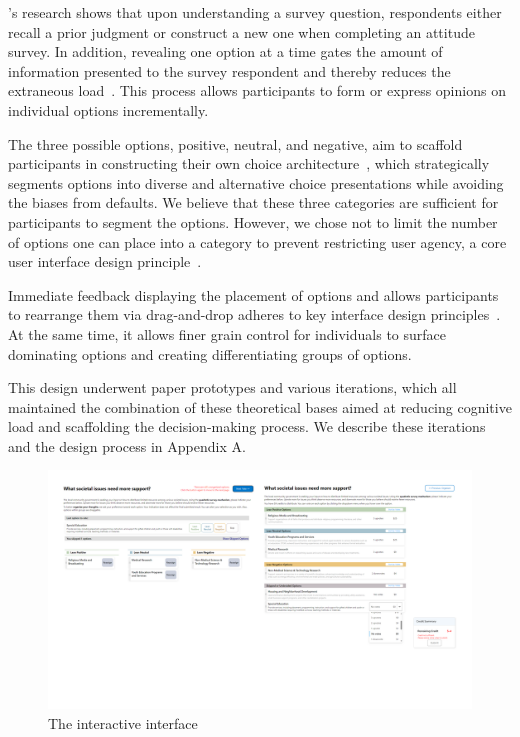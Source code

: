 \textcite{strackThinkingJudgingCommunicating1987}'s research shows that upon understanding a survey question, respondents either recall a prior judgment or construct a new one when completing an attitude survey. In addition, revealing one option at a time gates the amount of information presented to the survey respondent and thereby reduces the extraneous load~\cite{swellerCognitiveLoadTheory2011}. This process allows participants to form or express opinions on individual options incrementally.

The three possible options, positive, neutral, and negative, aim to scaffold participants in constructing their own choice architecture~\cite{munscherReviewTaxonomyChoice2016, thalerNudgeImprovingDecisions2008a}, which strategically segments options into diverse and alternative choice presentations while avoiding the biases from defaults. We believe that these three categories are sufficient for participants to segment the options. However, we chose not to limit the number of options one can place into a category to prevent restricting user agency, a core user interface design principle~\cite{norman2013design}.

Immediate feedback displaying the placement of options and allows participants to rearrange them via drag-and-drop adheres to key interface design principles~\cite{norman2013design}. At the same time, it allows finer grain control for individuals to surface dominating options and creating differentiating groups of options.

This design underwent paper prototypes and various iterations, which all maintained the combination of these theoretical bases aimed at reducing cognitive load and scaffolding the decision-making process. We describe these iterations and the design process in Appendix A.
\begin{figure}[h]
    \centering
    \includegraphics[width=1\textwidth]{content/image/interface.png}
    \caption{The interactive interface}
    \label{fig:interactiveInterface}
\end{figure}

